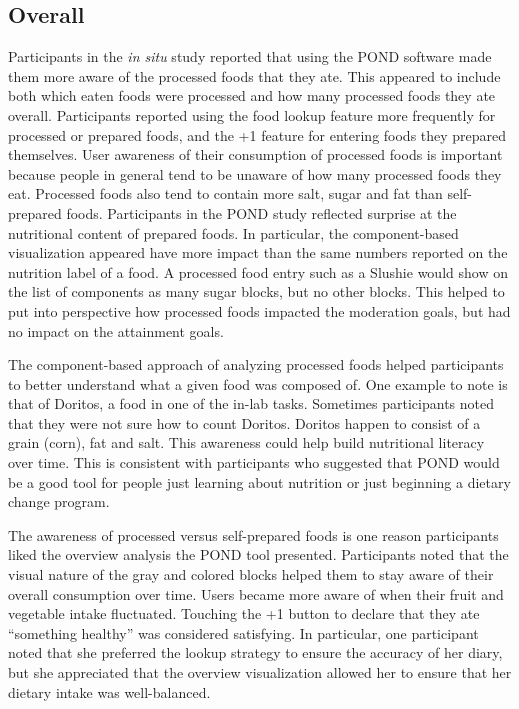 \subsection{Overall}
Participants in the \textit{in situ} study reported that using the POND software made them more aware of the processed foods that they ate. This appeared to include both which eaten foods were processed and how many processed foods they ate overall. Participants reported using the food lookup feature more frequently for processed or prepared foods, and the +1 feature for entering foods they prepared themselves. User awareness of their consumption of processed foods is important because people in general tend to be unaware of how many processed foods they eat. Processed foods also tend to contain more salt, sugar and fat than self-prepared foods. Participants in the POND study reflected surprise at the nutritional content of prepared foods. In particular, the component-based visualization appeared have more impact than the same numbers reported on the nutrition label of a food. A processed food entry such as a Slushie would show on the list of components as many sugar blocks, but no other blocks. This helped to put into perspective how processed foods impacted the moderation goals, but had no impact on the attainment goals. 

The component-based approach of analyzing processed foods helped participants to better understand what a given food was composed of. One example to note is that of Doritos, a food in one of the in-lab tasks. Sometimes participants noted that they were not sure how to count Doritos. Doritos happen to consist of a grain (corn), fat and salt. This awareness could help build nutritional literacy over time. This is consistent with participants who suggested that POND would be a good tool for people just learning about nutrition or just beginning a dietary change program. 

The awareness of processed versus self-prepared foods is one reason participants liked the overview analysis the POND tool presented. Participants noted that the visual nature of the gray and colored blocks helped them to stay aware of their overall consumption over time. Users became more aware of when their fruit and vegetable intake fluctuated. Touching the +1 button to declare that they ate ``something healthy'' was considered satisfying. In particular, one participant noted that she preferred the lookup strategy to ensure the accuracy of her diary, but she appreciated that the overview visualization allowed her to ensure that her dietary intake was well-balanced. 

